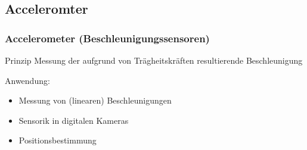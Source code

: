 \documentclass[10pt,a4paper,oneside]{beamer}
\begin{document}
\begin{frame}
	\subsection{Acceleromter}
	\frametitle{Accelerometer (Beschleunigungssensoren)}
	\begin{block}{Prinzip}
		Messung der aufgrund von Trägheitskräften resultierende Beschleunigung
	\end{block}
	Anwendung:
	\begin{itemize}
    	\item Messung von (linearen) Beschleunigungen
  		\item Sensorik in digitalen Kameras
		\item Positionsbestimmung
	\end{itemize}
	\begin{figure}
\hfil
{}\hfil
\end{figure}

\end{frame}
\end{document}
